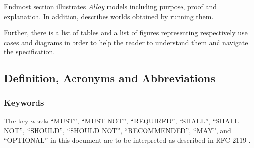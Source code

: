 \documentclass[a4paper]{article}
\begin{document}
        Endmost section illustrates \textit{Alloy} models including purpose, proof and explanation. In addition, describes worlds obtained by running them.
        
        Further, there is a list of tables and a list of figures representing respectively use cases and diagrams in order to help the reader to understand them and navigate the specification.
        
    \subsection{Definition, Acronyms and  Abbreviations}
            \subsubsection{Keywords}
            The key words “MUST”, “MUST NOT”, “REQUIRED”, “SHALL”, “SHALL NOT”, “SHOULD”, “SHOULD NOT”, “RECOMMENDED”, “MAY”, and “OPTIONAL” in this document are to be interpreted as described in RFC 2119 \cite{bradner1997key}.
\end{document}
